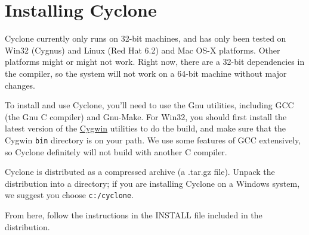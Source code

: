 \section{Installing Cyclone}
\label{sec:install}
Cyclone currently only runs on 32-bit machines, and has only been
tested on Win32 (Cygnus) and Linux (Red Hat 6.2) and Mac OS-X platforms.  
Other
platforms might or might not work.  Right now, there are a 32-bit
dependencies in the compiler, so the system will not work on
a 64-bit machine without major changes.

To install and use Cyclone, you'll need to use the Gnu utilities,
including GCC (the Gnu C compiler) and Gnu-Make.  For Win32, you
should first install the latest version of the
\href{http://cygwin.com/}{Cygwin} utilities to do the build, and make
sure that the Cygwin \texttt{bin} directory is on your path. We use
some features of GCC extensively, so Cyclone definitely will not build
with another C compiler.

Cyclone is distributed as a compressed archive (a .tar.gz file).
Unpack the distribution into a directory; if you are installing
Cyclone on a Windows system, we suggest you choose
\texttt{c:/cyclone}.

From here, follow the instructions in the INSTALL file included in the
distribution.






